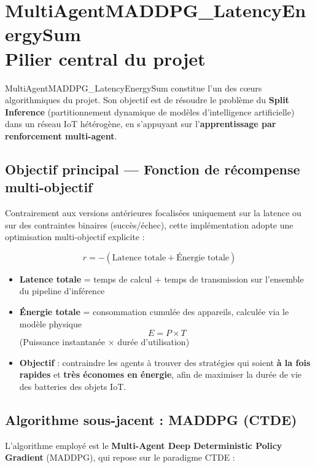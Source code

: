\documentclass{article}
\begin{document}
\section{MultiAgentMADDPG\_\-LatencyEnergySum \\ Pilier central du projet}

MultiAgentMADDPG\_LatencyEnergySum constitue l’un des cœurs algorithmiques du projet.  
Son objectif est de résoudre le problème du \textbf{Split Inference} (partitionnement dynamique de modèles d’intelligence artificielle) dans un réseau IoT hétérogène, en s’appuyant sur l’\textbf{apprentissage par renforcement multi-agent}.

\subsection{Objectif principal --- Fonction de récompense multi-objectif}

Contrairement aux versions antérieures focalisées uniquement sur la latence ou sur des contraintes binaires (succès/échec), cette implémentation adopte une optimisation multi-objectif explicite :

\begin{equation}
    r = -(\text{Latence totale} + \text{Énergie totale})
\end{equation}

\begin{itemize}[label=$\bullet$]
    \item \textbf{Latence totale} = temps de calcul + temps de transmission sur l’ensemble du pipeline d’inférence
    \item \textbf{Énergie totale} = consommation cumulée des appareils, calculée via le modèle physique
    \[
    E = P \times T
    \]
    (Puissance instantanée $\times$ durée d’utilisation)
    \item \textbf{Objectif} : contraindre les agents à trouver des stratégies qui soient \textbf{à la fois rapides} et \textbf{très économes en énergie}, afin de maximiser la durée de vie des batteries des objets IoT.
\end{itemize}

\subsection{Algorithme sous-jacent : MADDPG (CTDE)}

L’algorithme employé est le \textbf{Multi-Agent Deep Deterministic Policy Gradient} (MADDPG), qui repose sur le paradigme CTDE :
\end{document}
